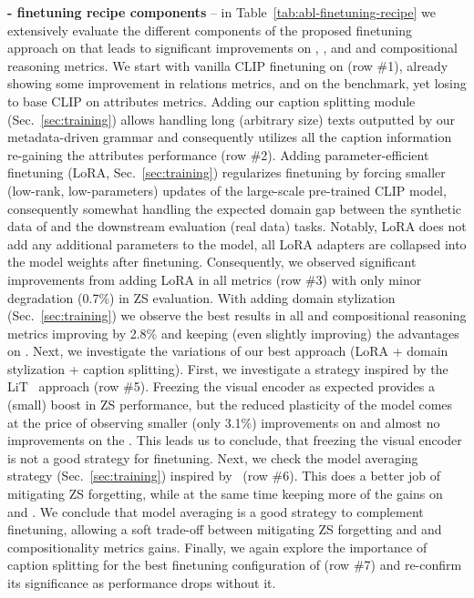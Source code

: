 \noindent\textbf{\ourdataset{} - finetuning recipe components} -- in Table~\ref{tab:abl-finetuning-recipe} we extensively evaluate the different components of the proposed finetuning approach on \ourdataset{} that leads to significant improvements on \vlchecklist{}, \ARO, and \winoground{} \vlc{} and compositional reasoning metrics. We start with vanilla CLIP finetuning on \ourdataset{} (row \#1), already showing some improvement in \vlchecklist{} relations metrics, and on the \ARO{} benchmark, yet losing to base CLIP on \vlchecklist{} attributes metrics. Adding our caption splitting module (Sec.~\ref{sec:training}) allows handling long (arbitrary size) texts outputted by our metadata-driven grammar and consequently utilizes all the caption information re-gaining the attributes performance (row \#2). Adding parameter-efficient finetuning (LoRA, Sec.~\ref{sec:training}) regularizes finetuning by forcing smaller (low-rank, low-parameters) updates of the large-scale pre-trained CLIP model, consequently somewhat handling the expected domain gap between the synthetic data of \ourdataset{} and the downstream evaluation (real data) tasks. Notably, LoRA does not add any additional parameters to the model, all LoRA adapters are collapsed into the model weights after finetuning. Consequently, we observed significant improvements from adding LoRA in all metrics (row \#3) with only minor degradation (0.7\%) in ZS evaluation. With adding domain stylization (Sec.~\ref{sec:training}) we observe the best results in all \vlc{} and compositional reasoning metrics improving \ARO{} by 2.8\% and keeping (even slightly improving) the advantages on \vlchecklist{}. Next, we investigate the variations of our best approach (LoRA + domain stylization + caption splitting). First, we investigate a strategy inspired by the LiT~\cite{lit} approach (row \#5). Freezing the visual encoder  as expected provides a (small) boost in ZS performance, but the reduced plasticity of the model comes at the price of observing smaller (only 3.1\%) improvements on \ARO{} and almost no improvements on the \vlchecklist{}. This leads us to conclude, that freezing the visual encoder is not a good strategy for \ourdataset{} finetuning. Next, we check the model averaging strategy (Sec.~\ref{sec:training}) inspired by~\cite{wortsman2022robust} (row \#6). This does a better job of mitigating ZS forgetting, while at the same time keeping more of the gains on \vlchecklist{} and \ARO{}. We conclude that model averaging is a good strategy to complement \ourdataset{} finetuning, allowing a soft trade-off between mitigating ZS forgetting and \vlc{} and compositionality metrics gains. Finally, we again explore the importance of caption splitting for the best finetuning configuration of \ourdataset{} (row \#7) and re-confirm its significance as performance drops without it.


